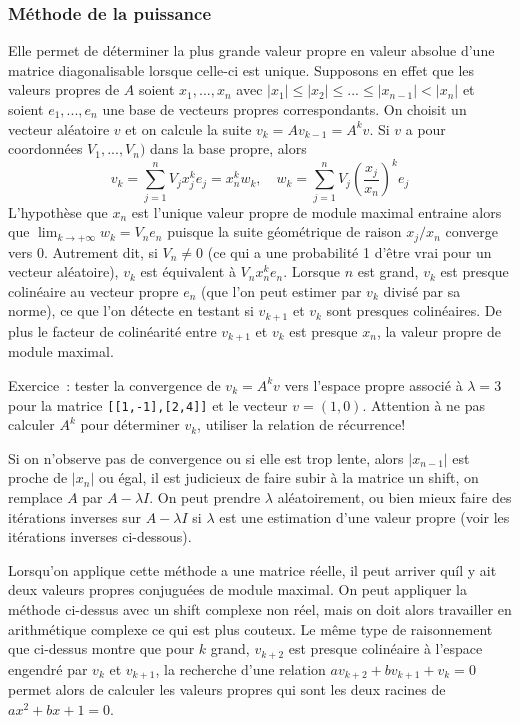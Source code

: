 \documentclass[a4paper,11pt]{article}
\begin{document}
\subsubsection{Méthode de la puissance} 
Elle permet de déterminer la plus grande valeur propre en valeur absolue
d'une matrice diagonalisable lorsque celle-ci est unique.
Supposons en effet que les valeurs propres de $A$ soient
$x_1,...,x_n$ avec $|x_1| \leq |x_2| \leq ... \leq |x_{n-1}| < |x_n|$
et soient $e_1,...,e_n$ une base de vecteurs propres correspondants.
On choisit un vecteur aléatoire $v$ et on calcule la suite
$v_k=Av_{k-1}=A^k v $. Si $v$ a pour coordonnées $V_1,...,V_n)$ 
dans la base propre, alors
\[ v_k = \sum_{j=1}^n V_j x_j^k e_j 
= x_n^k w_k, \quad w_k=\sum_{j=1}^n V_j \left(\frac{x_j}{x_n}\right)^k e_j
\]
L'hypothèse que $x_n$ est l'unique valeur propre
de module maximal entraine alors 
que $\lim_{k \rightarrow +\infty} w_k = V_n e_n$ puisque la suite
géométrique de raison $x_j/x_n$ converge vers 0.
Autrement dit, si $V_n\neq 0$ (ce qui a une probabilité 1 d'être
vrai pour un vecteur aléatoire), 
$v_k$ est équivalent à $V_n x_n^k e_n$. Lorsque $n$
est grand, $v_k$ est presque colinéaire au vecteur propre
$e_n$ (que l'on peut estimer par $v_k$ divisé par sa norme), 
ce que l'on détecte en testant si $v_{k+1}$ et $v_k$
sont presques colinéaires. De plus le facteur de colinéarité
entre $v_{k+1}$ et $v_k$ est presque $x_n$, la valeur propre
de module maximal.

Exercice~: tester la convergence de $v_k=A^kv$ vers l'espace propre
associé à $\lambda=3$ pour la matrice \verb|[[1,-1],[2,4]]|
et le vecteur $v=(1,0)$. Attention à ne pas calculer $A^k$ pour
déterminer $v_k$, utiliser la relation de récurrence!

Si on n'observe pas de convergence ou si elle est trop lente, alors
$|x_{n-1}|$ est proche de $|x_n|$ ou égal, il est judicieux
de faire subir à la matrice un shift, on remplace $A$ par
$A-\lambda I$. On peut prendre $\lambda$ aléatoirement, ou bien
mieux faire des itérations inverses sur $A-\lambda I$ si $\lambda$
est une estimation d'une valeur propre (voir les itérations inverses
ci-dessous).

Lorsqu'on applique cette méthode a une matrice réelle, il peut arriver
quíl y ait deux valeurs propres conjuguées de module maximal. On
peut appliquer la méthode ci-dessus avec un shift complexe non réel,
mais on doit alors travailler en arithmétique complexe 
ce qui est plus couteux. Le même
type de raisonnement que ci-dessus montre que pour $k$ grand,
$v_{k+2}$ est presque colinéaire à l'espace engendré par $v_k$ et $v_{k+1}$, 
la recherche d'une relation $ av_{k+2}+ b v_{k+1} + v_k=0$ 
permet alors de calculer les valeurs propres qui sont les deux racines
de $ax^2+bx+1=0$.
\end{document}
